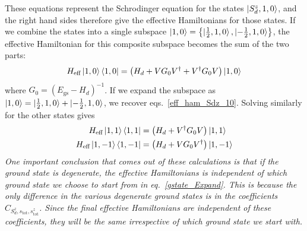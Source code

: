 \documentclass{revtex4-2}
\numberwithin{equation}{section}
\begin{document}
These equations represent the Schrodinger equation for the states \(\ket{S_d^z, 1, 0}\), and the right hand sides therefore give the effective Hamiltonians for those states. If we combine the states into a single subspace \(\ket{1,0}= \left\{\ket{\frac{1}{2}, 1, 0}, \ket{-\frac{1}{2}, 1, 0}\right\}\), the effective Hamiltonian for this composite subspace becomes the sum of the two parts:
\begin{equation}\begin{aligned}
	\label{eff_ham_10}
	H_\text{eff}\ket{1, 0}\bra{1, 0} = \left(H_d + V G_0 V^\dagger + V^\dagger G_0  V\right) \ket{1, 0}
\end{aligned}\end{equation}
where \(G_0 = \left(E_\text{gs} - H_d\right)^{-1}\). If we expand the subspace as \(\ket{1,0} = \ket{\frac{1}{2}, 1, 0} + \ket{-\frac{1}{2}, 1, 0}\), we recover eqs.~\ref{eff_ham_Sdz_10}. Solving similarly for the other states gives
\begin{equation}\begin{aligned}
	H_\text{eff}\ket{1,  1}\bra{1,  1} &= \left(H_d + V^\dagger G_0  V\right) \ket{1,  1}\\
	H_\text{eff}\ket{1, - 1}\bra{1, - 1} &= \left(H_d + V G_0 V^\dagger\right) \ket{1, - 1}
\end{aligned}\end{equation}
\textit{One important conclusion that comes out of these calculations is that if the ground state is degenerate, the effective Hamiltonians is independent of which ground state we choose to start from in eq.~\ref{gstate_Expand}. This is because the only difference in the various degenerate ground states is in the coefficients \(C_{S_d^z, s_\text{tot},s_\text{tot}^z}\). Since the final effective Hamiltonians are independent of these coefficients, they will be the same irrespective of which ground state we start with.}
\end{document}
